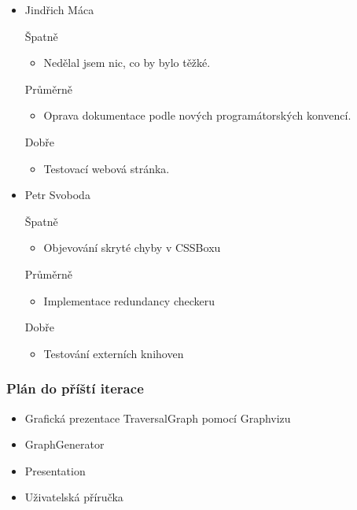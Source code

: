 \documentclass{beamer}
\begin{document}
\begin{frame}[allowframebreaks]
\begin{itemize}
    \item Jindřich Máca
      \begin{block}{Špatně} %
       \begin{itemize}
        \item Nedělal jsem nic, co by bylo těžké.
       \end{itemize}
     \end{block}
     \begin{block}{Průměrně} %
        \begin{itemize}
         \item Oprava dokumentace podle nových programátorských konvencí.
       \end{itemize}
     \end{block}
     \begin{block}{Dobře} %
       \begin{itemize}
        \item Testovací webová stránka.
       \end{itemize}
     \end{block}
   
    \item Petr Svoboda
      \begin{block}{Špatně} %
       \begin{itemize}
        \item Objevování skryté chyby v CSSBoxu
       \end{itemize}
     \end{block}
     \begin{block}{Průměrně} %
        \begin{itemize}
        \item Implementace redundancy checkeru
       \end{itemize}
     \end{block}
     \begin{block}{Dobře} %
       \begin{itemize}
        \item Testování externích knihoven
       \end{itemize}
     \end{block}
   \end{itemize}
\end{frame}

\begin{frame}[allowframebreaks]\frametitle{Plán do příští iterace}
  \begin{itemize}
		\item Grafická prezentace TraversalGraph pomocí Graphvizu
		\item GraphGenerator
		\item Presentation
		\item Uživatelská příručka
  \end{itemize}
\end{frame}
\end{document}
